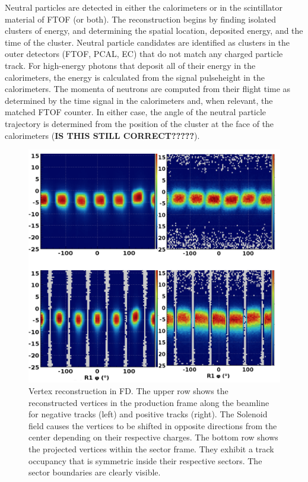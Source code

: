 \documentclass[final,3p,times,twocolumn,authoryear]{elsarticle}
\begin{document}
Neutral particles are detected in either the calorimeters or in the scintillator material of FTOF (or both). The 
reconstruction begins by finding isolated clusters of energy, and determining the spatial location, deposited 
energy, and the time of the cluster. Neutral particle candidates are identified as clusters in the outer detectors 
(FTOF, PCAL, EC) that do not match any charged particle track. For high-energy photons that deposit all of their 
energy in the calorimeters, the energy is calculated from the signal pulseheight in the calorimeters. The momenta 
of neutrons are computed from their flight time as determined by the time signal in the calorimeters and, 
when relevant, the matched FTOF counter. In either case, the angle of the neutral particle trajectory is determined
from the position of the cluster at the face of the calorimeters ({\bf IS THIS STILL CORRECT?????}).  
\begin{figure}[htbp!]
\centerline {
\includegraphics[width=0.96\columnwidth]{tracking_vertices.png}}
\caption{Vertex reconstruction in FD. The upper row shows the reconstructed vertices in the production frame along the beamline for negative tracks (left) and positive tracks (right). The Solenoid field causes the vertices to be shifted in opposite directions from the center depending on their respective charges. The bottom row shows the projected vertices within the sector frame. They exhibit a track occupancy that is symmetric inside their respective sectors. The sector boundaries are clearly visible.} 
\label{vertex}
\end{figure}
\end{document}
